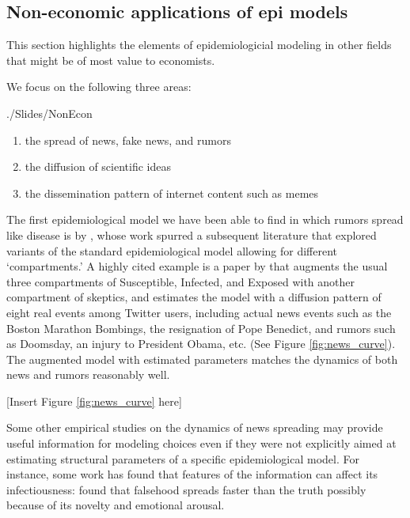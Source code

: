 \subsection{Non-economic applications of epi models}\label{subsec:nonecon}\hypertarget{nonecon}{}

This section highlights the elements of epidemiologicial modeling in other fields that might be of most value to economists.

We focus on the following three areas:
\begin{verbatimwrite}{./Slides/NonEcon}
\begin{enumerate}
    \item the spread of news, fake news, and rumors
    \item the diffusion of scientific ideas
    \item the dissemination pattern of internet content such as memes
\end{enumerate}
\end{verbatimwrite}


The first epidemiological model we have been able to find in which rumors spread like disease is by \cite{daley1964epidemics}, whose work spurred a subsequent literature that explored variants of the standard epidemiological model allowing for different `compartments.'  A highly cited example is a paper by \cite{jin2013epidemiological} that augments the usual three compartments of Susceptible, Infected, and Exposed with another compartment of skeptics, and estimates the model with a diffusion pattern of eight real events among Twitter users, including actual news events such as the Boston Marathon Bombings, the resignation of Pope Benedict, and rumors such as Doomsday, an injury to President Obama, etc. (See Figure \ref{fig:news_curve}). The augmented model with estimated parameters matches the dynamics of both news and rumors reasonably well.

\begin{center}
	[Insert Figure \ref{fig:news_curve}  here]
\end{center}

Some other empirical studies on the dynamics of news spreading may provide useful information for modeling choices even if they were not explicitly aimed at estimating structural parameters of a specific epidemiological model. For instance, some work has found that features of the information can affect its infectiousness:  \href{https://science.sciencemag.org/content/359/6380/1146}{\cite{vosoughi_spread_2018}} found that falsehood spreads faster than the truth possibly because of its novelty and emotional arousal.

